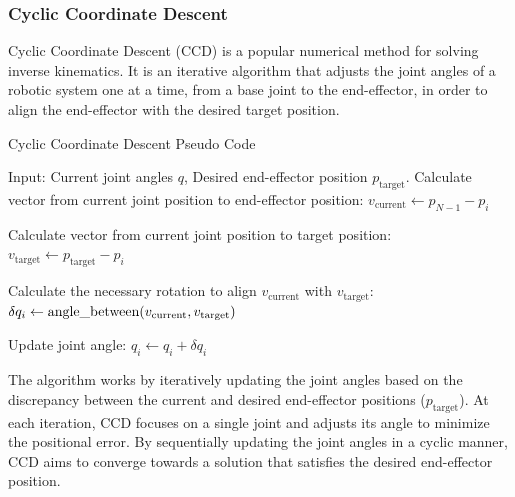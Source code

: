 \subsubsection{Cyclic Coordinate Descent}

Cyclic Coordinate Descent (CCD) \cite{NumericalMethods} is a popular numerical method for solving inverse kinematics. It is an iterative algorithm that adjusts the joint angles of a robotic system one at a time, from a base joint to the end-effector, in order to align the end-effector with the desired target position.

\begin{algorithm}
    \caption{Cyclic Coordinate Descent Pseudo Code}\label{alg:CCD}
    \begin{algorithmic}
        \State{} Input: Current joint angles $q$, Desired end-effector position $p_\text{target}$.
                \State{} Calculate vector from current joint position to end-effector position:
                \State{} $v_\text{current} \leftarrow p_{N-1} - p_i$

                \State{} Calculate vector from current joint position to target position:
                \State{} $v_\text{target} \leftarrow p_\text{target} - p_i$

                \State{} Calculate the necessary rotation to align $v_\text{current}$ with $v_\text{target}$:
                \State{} $\delta q_i \leftarrow \text{angle\textunderscore between}(v_\text{current}, v_\text{target})$

                \State{} Update joint angle:
                \State{} $q_i \leftarrow q_i + \delta q_i$
            \EndFor{}
        \EndWhile{}
\end{algorithmic}
\end{algorithm}

The algorithm works by iteratively updating the joint angles based on the discrepancy between the current and desired end-effector positions ($p_\text{target}$). At each iteration, CCD focuses on a single joint and adjusts its angle to minimize the positional error. By sequentially updating the joint angles in a cyclic manner, CCD aims to converge towards a solution that satisfies the desired end-effector position.

